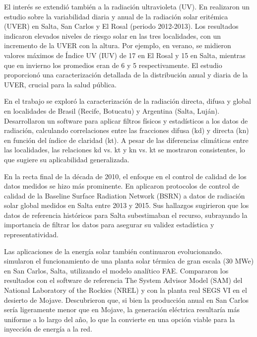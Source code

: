 \documentclass[letterpaper,12pt, twoside]{report}
\providecommand{\DIFdeltex}[1]{{\protect\color{red} \scriptsize #1}} %
\providecommand{\DIFdel}[1]{\texorpdfstring{\DIFdeltex{#1}}{}} %
\begin{document}
\DIFdel{El interés se extendió también a la radiación ultravioleta (UV). En \cite{Suazarez2014} realizaron un estudio sobre la variabilidad diaria y anual de la radiación solar eritémica (UVER) en Salta, San Carlos y El Rosal (periodo 2012-2013). Los resultados indicaron elevados niveles de riesgo solar en las tres localidades, con un incremento de la UVER con la altura. Por ejemplo, en verano, se midieron valores máximos de Índice UV (IUV) de 17 en El Rosal y 15 en Salta, mientras que en invierno los promedios eran de 6 y 5 respectivamente. El estudio proporcionó una caracterización detallada de la distribución anual y diaria de la UVER, crucial para la salud pública.}%

\DIFdel{En el trabajo \cite{Vilela2015} se exploró la caracterización de la radiación directa, difusa y global en localidades de Brasil (Recife, Botucatu) y Argentina (Salta, Luján). Desarrollaron un software para aplicar filtros físicos y estadísticos a los datos de radiación, calculando correlaciones entre las fracciones difusa (kd) y directa (kn) en función del índice de claridad (kt). A pesar de las diferencias climáticas entre las localidades, las relaciones kd vs. kt y kn vs. kt se mostraron consistentes, lo que sugiere su aplicabilidad generalizada.}%

\DIFdel{En la recta final de la década de 2010, el enfoque en el control de calidad de los datos medidos se hizo más prominente. En \cite{RomanoArmada2017} aplicaron protocolos de control de calidad de la Baseline Surface Radiation Network (BSRN) a datos de radiación solar global medidos en Salta entre 2013 y 2015. Sus hallazgos sugirieron que los datos de referencia históricos para Salta subestimaban el recurso, subrayando la importancia de filtrar los datos para asegurar su validez estadística y representatividad.}%

\DIFdel{Las aplicaciones de la energía solar también continuaron evolucionando. \cite{Hongn2018} simularon el funcionamiento de una planta solar térmica de gran escala (30 MWe) en San Carlos, Salta, utilizando el modelo analítico FAE. Compararon los resultados con el software de referencia The System Advisor Model (SAM) del National Laboratory of the Rockies (NREL) y con la planta real SEGS VI en el desierto de Mojave. Descubrieron que, si bien la producción anual en San Carlos sería ligeramente menor que en Mojave, la generación eléctrica resultaría más uniforme a lo largo del año, lo que la convierte en una opción viable para la inyección de energía a la red.}%
\end{document}
